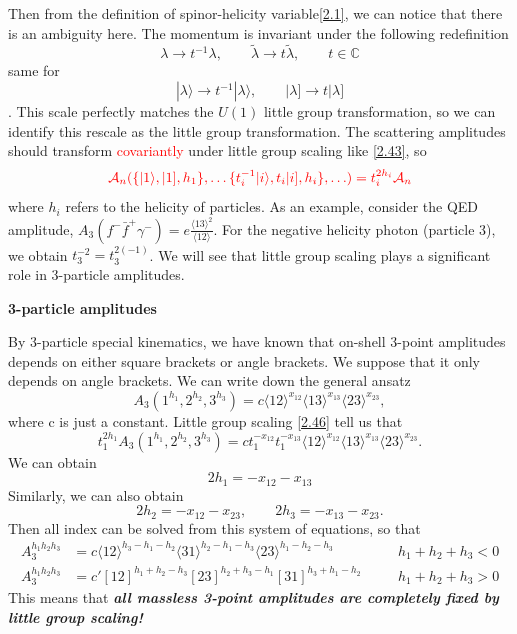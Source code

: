 \documentclass[12pt]{article}
\numberwithin{equation}{section}
\newcommand{\avg}[1]{\langle #1 \rangle}
\newcommand{\aket}[1]{|#1\rangle}
\newcommand{\sket}[1]{|#1]}
\begin{document}
Then from the definition of spinor-helicity variable\eqref{2.1}, we can notice that there is an ambiguity here.
The momentum is invariant under the following redefinition
    \begin{equation}
        \lambda \rightarrow t^{-1}\lambda, \qquad \tilde{\lambda}\rightarrow t\tilde{\lambda}, \qquad t\in\mathbb{C} 
    \end{equation}
    same for
    \begin{equation}
        \aket{\lambda}\rightarrow t^{-1}\aket{\lambda}, \qquad \sket{\lambda}\rightarrow t\sket{\lambda}
    \end{equation}.
This scale perfectly matches the $U(1)$ little group transformation, so we can identify this rescale as the little group transformation.
The scattering amplitudes should transform \textcolor{red}{covariantly} under little group scaling like \eqref{2.43}, so
\begin{equation}
    \color{red} \mathcal{A}_n(\{\aket{1},\sket{1},h_1\},\ldots\{t_i^{-1}\aket{i},t_i\sket{i},h_i\},\ldots )=t_i^{2h_i}\mathcal{A}_n
    \label{2.46}
\end{equation}
where $h_i$ refers to the helicity of particles.
As an example, consider the QED amplitude, $A_3(f^-\bar{f}^+\gamma^-)=e\frac{\avg{13}^2}{\avg{12}}$. For the negative helicity photon (particle 3), we obtain $t_3^{-2}=t_3^{2(-1)}$.
We will see that little group scaling plays a significant role in 3-particle amplitudes.

\noindent
\textbf{3-particle amplitudes}

\noindent
By 3-particle special kinematics, we have known that on-shell 3-point amplitudes depends on either square brackets or
angle brackets. We suppose that it only depends on angle brackets. We can write down the general ansatz
\begin{equation}
     A_3(1^{h_1},2^{h_2},3^{h_3})=c\avg{12}^{x_{12}}\avg{13}^{x_{13}}\avg{23}^{x_{23}},
\end{equation}
where c is just a constant. Little group scaling \eqref{2.46} tell us that
\begin{equation}
    t_1^{2h_1} A_3(1^{h_1},2^{h_2},3^{h_3})=ct_1^{-x_{12}}t_1^{-x_{13}}\avg{12}^{x_{12}}\avg{13}^{x_{13}}\avg{23}^{x_{23}}.
\end{equation}
We can obtain
    \begin{equation}
        2h_1=-x_{12}-x_{13}
    \end{equation}
    Similarly, we can also obtain
    \begin{equation}
        2h_2=-x_{12}-x_{23},\qquad 2h_3=-x_{13}-x_{23}.
    \end{equation}
    Then all index can be solved from this system of equations, so that
 \begin{align}
    A_3^{h_1h_2h_3} &= c\langle12\rangle^{h_3-h_1-h_2} \langle31\rangle^{h_2-h_1-h_3} \langle23\rangle^{h_1-h_2-h_3}
    && \quad h_1 + h_2 + h_3 < 0 \label{2.51}\\[0.5em] 
    A_3^{h_1h_2h_3} &= c' [12]^{h_1+h_2-h_3}[23]^{h_2+h_3-h_1}[31]^{h_3+h_1-h_2}
    && \quad h_1 + h_2 + h_3 > 0 \label{2.52}
\end{align}
This means that \textit{\textbf{all massless 3-point amplitudes are completely fixed by little group scaling!}}
\end{document}
